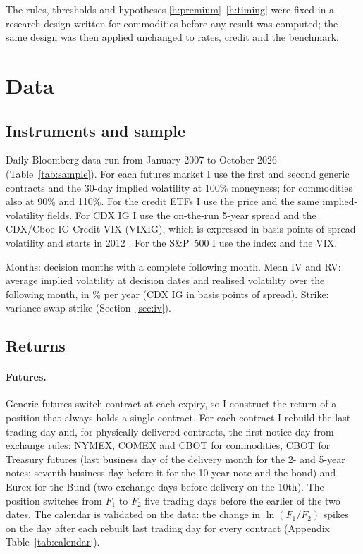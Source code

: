 \documentclass[11pt,a4paper]{article}
\theoremstyle{remark}
\newcommand{\note}[1]{\par\smallskip\parbox{\linewidth}{\footnotesize #1}}
\begin{document}
The rules, thresholds and hypotheses \ref{h:premium}--\ref{h:timing} were fixed in a research design written for commodities before any result was computed; the same design was then applied unchanged to rates, credit and the benchmark.

\section{Data}
\label{sec:data}

\subsection{Instruments and sample}

Daily Bloomberg data run from January 2007 to October 2026 (Table~\ref{tab:sample}). For each futures market I use the first and second generic contracts and the 30-day implied volatility at 100\% moneyness; for commodities also at 90\% and 110\%. For the credit ETFs I use the price and the same implied-volatility fields. For CDX IG I use the on-the-run 5-year spread and the CDX/Cboe IG Credit VIX (VIXIG), which is expressed in basis points of spread volatility and starts in 2012 \citep{spdji_creditvix}. For the S\&P~500 I use the index and the VIX.

\begin{table}[H]
\centering
\caption{Instruments and sample}
\label{tab:sample}
\small

\note{Months: decision months with a complete following month. Mean IV and RV: average implied volatility at decision dates and realised volatility over the following month, in \% per year (CDX IG in basis points of spread). Strike: variance-swap strike (Section~\ref{sec:iv}).}
\end{table}

\subsection{Returns}

\paragraph{Futures.} Generic futures switch contract at each expiry, so I construct the return of a position that always holds a single contract. For each contract I rebuild the last trading day and, for physically delivered contracts, the first notice day from exchange rules: NYMEX, COMEX and CBOT for commodities, CBOT for Treasury futures (last business day of the delivery month for the 2- and 5-year notes; seventh business day before it for the 10-year note and the bond) and Eurex for the Bund (two exchange days before delivery on the 10th). The position switches from $F_1$ to $F_2$ five trading days before the earlier of the two dates. The calendar is validated on the data: the change in $\ln(F_1/F_2)$ spikes on the day after each rebuilt last trading day for every contract (Appendix Table~\ref{tab:calendar}).
\end{document}
